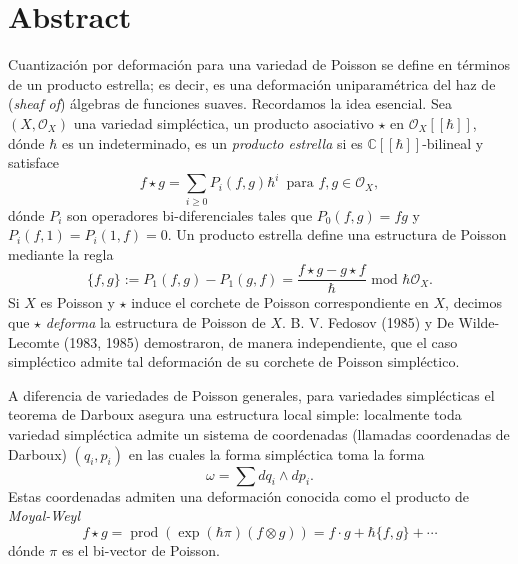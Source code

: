 \chapter*{Abstract}\label{ch:abstract}
Cuantización por deformación para una variedad de Poisson se define en términos de un producto estrella; es decir, es una deformación uniparamétrica del haz de (\textit{sheaf of}) álgebras de funciones suaves. Recordamos la idea esencial. Sea $(X, \mathscr{O}_{X})$ una variedad simpléctica, un producto asociativo $\star$ en $\mathscr{O}_X[[\hbar]]$, dónde $\hbar$ es un indeterminado, es un \textit{producto estrella} si es $\mathbb{C}[[\hbar]]$-bilineal y satisface
\[
        f \star g = \sum_{i\geq 0}P_i(f,g)\hbar^i\, \text{ para }f,g\in\mathscr{O}_X,
        \]
       	dónde $P_i$ son operadores bi-diferenciales tales que $P_0(f,g) = fg$ y $P_i(f,1) = P_i(1,f) = 0$. Un producto estrella define una estructura de Poisson mediante la regla
        \[
        \{f,g\} := P_1(f,g) - P_1(g,f) = \frac{f\star g - g\star f}{\hbar} \text{ mod } \hbar\mathscr{O}_X.
        \]
Si $X$ es Poisson y $\star$ induce el corchete de Poisson correspondiente en $X$, decimos que $\star$ \textit{deforma} la estructura de Poisson de $X$. B. V. Fedosov (1985) y De Wilde-Lecomte (1983, 1985) demostraron, de manera independiente, que el caso simpléctico admite tal deformación de su corchete de Poisson simpléctico.

A diferencia de variedades de Poisson generales, para variedades simplécticas el teorema de Darboux asegura una estructura local simple: localmente toda variedad simpléctica admite un sistema de coordenadas (llamadas coordenadas de Darboux) $(q_i, p_i)$ en las cuales la forma simpléctica toma la forma
\[
    \omega = \sum dq_i \wedge dp_i.
\]
Estas coordenadas admiten una deformación conocida como el producto de \textit{Moyal-Weyl}  \[
    f \star g=\operatorname{prod}(\exp (\hbar \pi)(f \otimes g))=f \cdot g+\hbar\{f, g\}+\cdots
    \]
dónde $\pi$ es el bi-vector de Poisson.    

